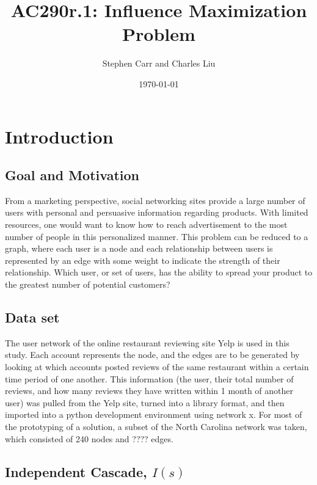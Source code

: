 \documentclass{article}
\begin{document}
	\title{AC290r.1: Influence Maximization Problem}
	\author{Stephen Carr and Charles Liu}
	\date{\today}
	\maketitle
	
	\section{Introduction}
	
	\subsection{Goal and Motivation}
	
	From a marketing perspective, social networking sites provide a large number of users with personal and persuasive information regarding products. With limited resources, one would want to know how to reach advertisement to the most number of people in this personalized manner. This problem can be reduced to a graph, where each user is a node and each relationship between users is represented by an edge with some weight to indicate the strength of their relationship. Which user, or set of users, has the ability to spread your product to the greatest number of potential customers?
	
	\subsection{Data set}
	
	The user network of the online restaurant reviewing site Yelp is used in this study. Each account represents the node, and the edges are to be generated by looking at which accounts posted reviews of the same restaurant within a certain time period of one another. This information (the user, their total number of reviews, and how many reviews they have written within 1 month of another user) was pulled from the Yelp site, turned into a library format, and then imported into a python development environment using network x. For most of the prototyping of a solution, a subset of the North Carolina network was taken, which consisted of 240 nodes and ???? edges.
	
	\subsection{Independent Cascade, $I(s)$}
	
\end{document}
